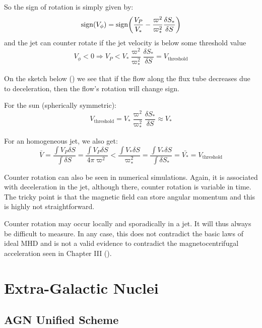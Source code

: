 \documentclass[10pt,a4paper,english]{article}
\let\originalleft\left
\let\originalright\right
\renewcommand{\left}{\mathopen{}\mathclose\bgroup\originalleft}
\renewcommand{\right}{\aftergroup\egroup\originalright}
\begin{document}
So the sign of rotation is simply given by:
\begin{equation}
    \mathrm{sign}\left( V_\phi \right) = \mathrm{sign}\left( \frac{V_P}{V_*} - \frac{\varpi^2}{\varpi_*^2} \frac{\delta S_*}{\delta S} \right)
\end{equation}
and the jet can counter rotate if the jet velocity is below some threshold
value
\begin{equation}
    V_\phi < 0 \Rightarrow V_P < V_* \frac{\varpi^2}{\varpi_*^2} \frac{\delta S_*}{\delta S} = V_\mathrm{threshold}
\end{equation}

On the sketch below () we see that if the flow along the
flux tube decreases due to deceleration, then the flow's rotation will change
sign.

For the sun (spherically symmetric):
\begin{equation}
    V_\mathrm{threshold} = V_* \frac{\varpi^2}{\varpi_*^2}\frac{\delta S_*}{\delta S} \approx V_*
\end{equation}

For an homogeneous jet, we also get:
\begin{equation}
    \bar{V} = \frac{\int V_P \delta S}{\int \delta S} = \frac{\int V_P \delta S}{4\pi\varpi^2} < \frac{\int V_* \delta S}{\varpi^2_*} = \frac{\int V_* \delta S}{\int \delta S_*} = \bar{V_*} = V_\mathrm{threshold}
\end{equation}

Counter rotation can also be seen in numerical simulations. Again, it is
associated with deceleration in the jet, although there, counter rotation is
variable in time. The tricky point is that the magnetic field can store angular
momentum and this is highly not straightforward.


Counter rotation may occur locally and sporadically in a jet. It will thus
always be difficult to measure. In any case, this does not contradict the basic
laws of ideal MHD and is not a valid evidence to contradict the
magnetocentrifugal acceleration seen in Chapter III ().

\section{Extra-Galactic Nuclei}

\subsection{AGN Unified Scheme}
\end{document}
